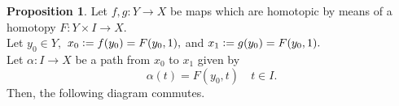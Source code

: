 \documentclass[12pt]{article}
\theoremstyle{definition}
\numberwithin{thm}{section}
\newtheorem{prop}[thm]{Proposition}
\begin{document}
\begin{prop} \label{prop:homsamehomo}
	Let $f, g:Y\to X$ be maps which are homotopic by means of a homotopy $F:Y \times I \to X.$ \\
	Let $y_0 \in Y,$ $x_0 \vcentcolon= f(y_0) = F(y_0, 1),$ and $x_1 \vcentcolon= g(y_0) = F(y_0, 1).$\\
	Let $\alpha:I \to X$ be a path from $x_0$ to $x_1$ given by
	\begin{equation*} 
		\alpha(t) = F(y_0, t) \quad t \in I.
	\end{equation*}
	Then, the following diagram commutes.
	\begin{center}
	\end{center}
\end{prop}
\end{document}
